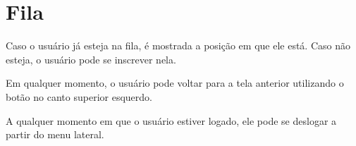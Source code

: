 \documentclass{book}
\begin{document}
\section{Fila}
Caso o usuário já esteja na fila, é mostrada a posição em que ele está. Caso não
esteja, o usuário pode se inscrever nela.

Em qualquer momento, o usuário pode voltar para a tela anterior utilizando o
botão no canto superior esquerdo.

A qualquer momento em que o usuário estiver logado, ele pode se deslogar a
partir do menu lateral.
\end{document}
